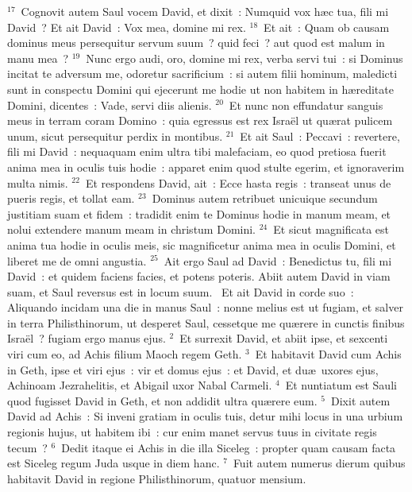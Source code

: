 ${}^{17}$~Cognovit autem Saul vocem David, et dixit~: Numquid vox h\ae c tua, fili mi David~? Et ait David~: Vox mea, domine mi rex.
${}^{18}$~Et ait~: Quam ob causam dominus meus persequitur servum suum~? quid feci~? aut quod est malum in manu mea~?
${}^{19}$~Nunc ergo audi, oro, domine mi rex, verba servi tui~: si Dominus incitat te adversum me, odoretur sacrificium~: si autem filii hominum, maledicti sunt in conspectu Domini qui ejecerunt me hodie ut non habitem in h\ae reditate Domini, dicentes~: Vade, servi diis alienis.
${}^{20}$~Et nunc non effundatur sanguis meus in terram coram Domino~: quia egressus est rex Isra\"el ut qu\ae rat pulicem unum, sicut persequitur perdix in montibus.
${}^{21}$~Et ait Saul~: Peccavi~: revertere, fili mi David~: nequaquam enim ultra tibi malefaciam, eo quod pretiosa fuerit anima mea in oculis tuis hodie~: apparet enim quod stulte egerim, et ignoraverim multa nimis.
${}^{22}$~Et respondens David, ait~: Ecce hasta regis~: transeat unus de pueris regis, et tollat eam.
${}^{23}$~Dominus autem retribuet unicuique secundum justitiam suam et fidem~: tradidit enim te Dominus hodie in manum meam, et nolui extendere manum meam in christum Domini.
${}^{24}$~Et sicut magnificata est anima tua hodie in oculis meis, sic magnificetur anima mea in oculis Domini, et liberet me de omni angustia.
${}^{25}$~Ait ergo Saul ad David~: Benedictus tu, fili mi David~: et quidem faciens facies, et potens poteris. Abiit autem David in viam suam, et Saul reversus est in locum suum.
~\lettrine[lines=10,image=true,loversize=0.05,lraise=-0.03]{E}{}t ait David in corde suo~: Aliquando incidam una die in manus Saul~: nonne melius est ut fugiam, et salver in terra Philisthinorum, ut desperet Saul, cessetque me qu\ae rere in cunctis finibus Isra\"el~? fugiam ergo manus ejus.
${}^{2}$~Et surrexit David, et abiit ipse, et sexcenti viri cum eo, ad Achis filium Maoch regem Geth.
${}^{3}$~Et habitavit David cum Achis in Geth, ipse et viri ejus~: vir et domus ejus~: et David, et du\ae\ uxores ejus, Achinoam Jezrahelitis, et Abigail uxor Nabal Carmeli.
${}^{4}$~Et nuntiatum est Sauli quod fugisset David in Geth, et non addidit ultra qu\ae rere eum.
${}^{5}$~Dixit autem David ad Achis~: Si inveni gratiam in oculis tuis, detur mihi locus in una urbium regionis hujus, ut habitem ibi~: cur enim manet servus tuus in civitate regis tecum~?
${}^{6}$~Dedit itaque ei Achis in die illa Siceleg~: propter quam causam facta est Siceleg regum Juda usque in diem hanc.
${}^{7}$~Fuit autem numerus dierum quibus habitavit David in regione Philisthinorum, quatuor mensium.


